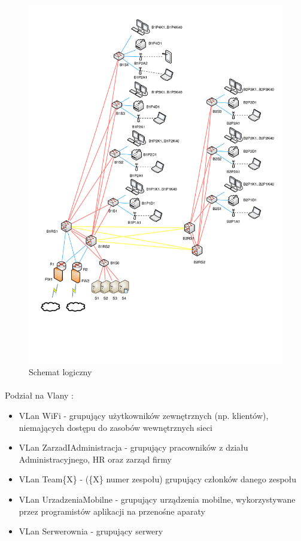 \newpage
\begin{figure}[H]
  \begin{center}
    \includegraphics[width=\textwidth]{img/schemat.pdf}
    \caption{Schemat logiczny}
  \end{center}
\end{figure}


\paragraph{}
Podział na Vlany :
\begin{itemize}
	\item VLan WiFi - grupujący użytkowników zewnętrznych (np. klientów), niemających dostępu do zasobów wewnętrznych sieci
	\item VLan ZarzadIAdministracja - grupujący pracowników z działu Administracyjnego, HR oraz zarząd firmy
	\item VLan Team\{X\} - (\{X\} numer zespołu) grupujący członków danego zespołu
	\item VLan UrzadzeniaMobilne - grupujący urządzenia mobilne, wykorzystywane przez programistów aplikacji na przenośne aparaty
	\item VLan Serwerownia - grupujący serwery
\end{itemize}

